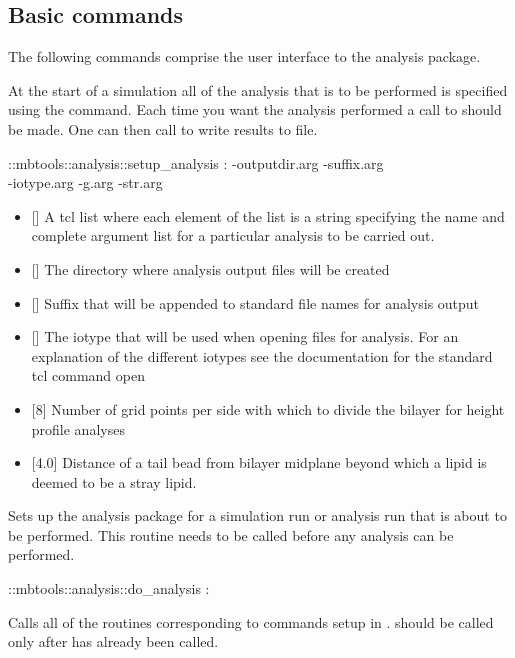 \subsection{Basic commands}
The following commands comprise the user interface to the analysis package.

At the start of a simulation all of the analysis that is to be performed is specified using the  command. Each time you want the analysis performed a call to  should be made. One can then call  to write results to file.

\begin{code} 
  ::mbtools::analysis::setup_analysis : -outputdir.arg -suffix.arg \\
  -iotype.arg -g.arg -str.arg
\end{code}
\begin{itemize}
  \item {} [] A tcl list where each element of the list is a string specifying the name and complete argument list for a particular analysis to be carried out.
  \item {} [] The directory where analysis output files will be created
  \item {} [] Suffix that will be appended to standard file names for analysis output
  \item {} [] The iotype that will be used when opening files for analysis. For an explanation of the different iotypes see the documentation for the standard tcl command open
  \item {} [8] Number of grid points per side with which to divide the bilayer for height profile analyses
  \item {} [4.0] Distance of a tail bead from bilayer midplane beyond which a lipid is deemed to be a stray lipid.
\end{itemize}

Sets up the analysis package for a simulation run or analysis run that is about to be performed. This routine needs to be called before any analysis can be performed.

\begin{code}
 ::mbtools::analysis::do_analysis :
\end{code}
Calls all of the  routines corresponding to commands setup in .  should be called only after  has already been called. 

